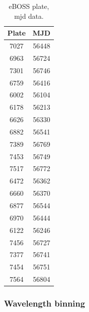 \begin{table}[h]
\caption{eBOSS plate, mjd data.}
\label{tab:eboss_plates}
\centering
\begin{tabular}{|c|c|}
\hline
  Plate & MJD \\
  \hline \hline
  7027 & 56448 \\
  \hline
  6963 & 56724 \\
  \hline
  7301 & 56746 \\
  \hline
  6759 & 56416 \\
  \hline
  6002 & 56104 \\
  \hline
  6178 & 56213 \\
  \hline
  6626 & 56330 \\
  \hline
  6882 & 56541 \\
  \hline
  7389 & 56769 \\
  \hline
  7453 & 56749 \\
  \hline
  7517 & 56772 \\
  \hline
  6472 & 56362 \\
  \hline
  6660 & 56370 \\
  \hline
  6877 & 56544 \\
  \hline
  6970 & 56444 \\
  \hline
  6122 & 56246 \\
  \hline
  7456 & 56727 \\
  \hline
  7377 & 56741 \\
  \hline
  7454 & 56751 \\
  \hline
  7564 & 56804 \\
  \hline
\end{tabular}
\end{table}


\subsubsection{Wavelength binning}

